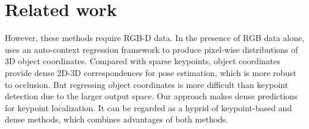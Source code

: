 \documentclass[10pt,twocolumn,letterpaper]{article}
\begin{document}
\section{Related work}%


However, these methods require RGB-D data. 
In the presence of RGB data alone, \cite{brachmann2016uncertainty} uses an auto-context regression framework \cite{tu2010auto} to produce pixel-wise distributions of 3D object coordinates. 
Compared with sparse keypoints, object coordinates provide dense 2D-3D correspondences for pose estimation, which is more robust to occlusion. But regressing object coordinates is more difficult than keypoint detection due to the larger output space. Our approach makes dense predictions for keypoint localization. It can be regarded as a hyprid of keypoint-based and dense methods, which combines advantages of both methods.
\end{document}
